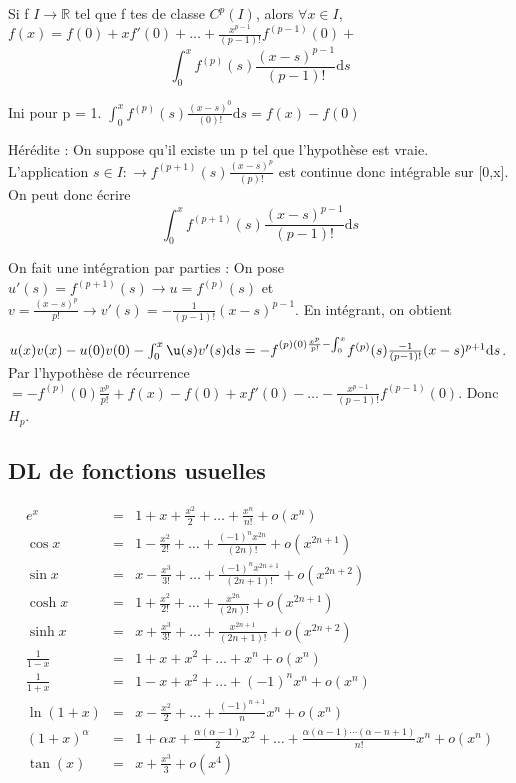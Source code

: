 \documentclass[french]{yLectureNote}
\newcommand{\R}[0]{\mathbb{R}}
\newcommand{\dd}[0]{\mathrm{d}}
\begin{document}
\begin{theorem}
 Si f \(I\to \R\) tel que f tes de classe \(C^p(I)\), alors \(\forall x\in I\), \(f(x) = f(0)+xf'(0)+\dots+\frac{x^{p-1}}{(p-1)!}f^{(p-1)}(0) + \)
 \[\int^x_0f^{(p)}(s) \frac{(x-s)^{p-1}}{(p-1)!}\dd s\]
\end{theorem}
\begin{myproof}
Ini pour p = 1.
\(\int^x_0f^{(p)}(s) \frac{(x-s)^{0}}{(0)!}\dd s = f(x)-f(0)\)

Hérédite : On suppose qu'il existe un p tel que l'hypothèse est vraie. L'application \(s\in I : \to f^{(p+1)}(s) \frac{(x-s)^{p}}{(p)!}\) est continue donc intégrable sur [0,x]. On peut donc écrire \[\int^x_0f^{(p+1)}(s) \frac{(x-s)^{p-1}}{(p-1)!}\dd s\]

On fait une intégration par parties : On pose \(u'(s) = f^{(p+1)}(s) \to u = f^{(p)}(s)\) et \(v = \frac{(x-s)^p}{p!} \to v'(s) = -\frac{1}{(p-1)!}(x-s)^{p-1}\). En intégrant, on obtient

\(u(x)v(x)-u(0)v(0) - \int^x_0\u(s)v'(s)\dd s = -f^{(p)(0)\frac{x^p}{p!}-\int^x_0}f^{(p)}(s)\frac{-1}{(p-1)!}(x-s)^{p+1}\dd s\). Par l'hypothèse de récurrence \( = -f^{(p)}(0)\frac{x^p}{p!}+f(x)-f(0)+xf'(0)-\dots-\frac{x^{p-1}}{(p-1)!}f^{(p-1)}(0)\). Donc $H_p$.

\end{myproof}
\subsection{DL de fonctions usuelles}
\begin{eqnarray*}
e^x&=&1+x+\frac{x^2}2+\dots+\frac{x^n}{n!}+o(x^n)\\
\cos x&=&1-\frac{x^2}{2!}+\dots+\frac{(-1)^n x^{2n}}{(2n)!}+o(x^{2n+1})\\
\sin x&=&x-\frac{x^3}{3!}+\dots+\frac{(-1)^n x^{2n+1}}{(2n+1)!}+o(x^{2n+2})\\
\cosh x&=&1+\frac{x^2}{2!}+\dots+\frac{x^{2n}}{(2n)!}+o(x^{2n+1})\\
\sinh x&=&x+\frac{x^3}{3!}+\dots+\frac{ x^{2n+1}}{(2n+1)!}+o(x^{2n+2})\\
\frac{1}{1-x}&=&1+x+x^2+\dots+x^n+o(x^n)\\
\frac{1}{1+x}&=&1-x+x^2+\dots+(-1)^nx^n+o(x^n)\\
\ln(1+x)&=&x-\frac{x^2}2+\dots+\frac{(-1)^{n+1}}{n}x^n+o(x^n)\\
(1+x)^\alpha&=&1+\alpha x+\frac{\alpha(\alpha-1)}2x^2+\dots+\frac{\alpha(\alpha-1)\cdots (\alpha-n+1)}{n!}x^n+o(x^n)\\
\tan(x) &=& x+\frac{x^3}{3}+o(x^4)\\
\end{eqnarray*}
\end{document}
